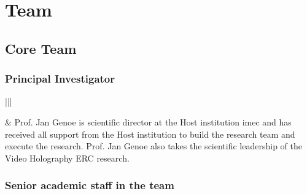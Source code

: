 \documentclass[a4paper,10pt,english,openany,oneside]{jupyterBook}
\begin{document}
\sphinxstepscope


\chapter{Team}
\label{\detokenize{Team:team}}\label{\detokenize{Team::doc}}

\section{Core Team}
\label{\detokenize{Team:core-team}}

\subsection{Principal Investigator}
\label{\detokenize{Team:principal-investigator}}

\begin{savenotes}\sphinxattablestart
\centering
\begin{tabular}[t]{|||}
\hline

\sphinxAtStartPar
{}
&
\sphinxAtStartPar
Prof. Jan Genoe is scientific director at the Host institution imec and has received all support from the Host institution to build the research team and execute the research. Prof. Jan Genoe also takes the scientific leadership of the Video Holography ERC research.
\\
\hline
\end{tabular}
\par
\sphinxattableend\end{savenotes}


\subsection{Senior academic staff in the team}
\label{\detokenize{Team:senior-academic-staff-in-the-team}}
\end{document}
